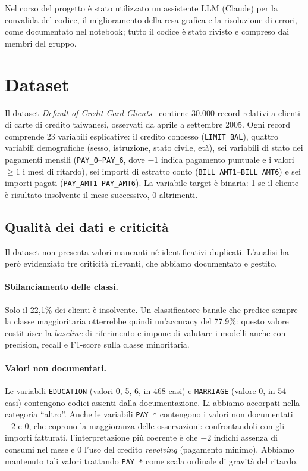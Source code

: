 \documentclass[11pt,a4paper]{article}
\begin{document}
Nel corso del progetto \`e stato utilizzato un assistente LLM (Claude) per la convalida del codice, il miglioramento della resa grafica e la risoluzione di errori, come documentato nel notebook; tutto il codice \`e stato rivisto e compreso dai membri del gruppo.

\section{Dataset}

Il dataset \emph{Default of Credit Card Clients}~\cite{yeh2009} contiene 30.000 record relativi a clienti di carte di credito taiwanesi, osservati da aprile a settembre 2005. Ogni record comprende 23 variabili esplicative: il credito concesso (\texttt{LIMIT\_BAL}), quattro variabili demografiche (sesso, istruzione, stato civile, et\`a), sei variabili di stato dei pagamenti mensili (\texttt{PAY\_0}--\texttt{PAY\_6}, dove $-1$ indica pagamento puntuale e i valori $\geq 1$ i mesi di ritardo), sei importi di estratto conto (\texttt{BILL\_AMT1}--\texttt{BILL\_AMT6}) e sei importi pagati (\texttt{PAY\_AMT1}--\texttt{PAY\_AMT6}). La variabile target \`e binaria: 1 se il cliente \`e risultato insolvente il mese successivo, 0 altrimenti.

\subsection{Qualit\`a dei dati e criticit\`a}

Il dataset non presenta valori mancanti n\'e identificativi duplicati. L'analisi ha per\`o evidenziato tre criticit\`a rilevanti, che abbiamo documentato e gestito.

\paragraph{Sbilanciamento delle classi.} Solo il 22,1\% dei clienti \`e insolvente. Un classificatore banale che predice sempre la classe maggioritaria otterrebbe quindi un'accuracy del 77,9\%: questo valore costituisce la \emph{baseline} di riferimento e impone di valutare i modelli anche con precision, recall e F1-score sulla classe minoritaria.

\paragraph{Valori non documentati.} Le variabili \texttt{EDUCATION} (valori 0, 5, 6, in 468 casi) e \texttt{MARRIAGE} (valore 0, in 54 casi) contengono codici assenti dalla documentazione. Li abbiamo accorpati nella categoria ``altro''. Anche le variabili \texttt{PAY\_*} contengono i valori non documentati $-2$ e 0, che coprono la maggioranza delle osservazioni: confrontandoli con gli importi fatturati, l'interpretazione pi\`u coerente \`e che $-2$ indichi assenza di consumi nel mese e 0 l'uso del credito \emph{revolving} (pagamento minimo). Abbiamo mantenuto tali valori trattando \texttt{PAY\_*} come scala ordinale di gravit\`a del ritardo.
\end{document}
